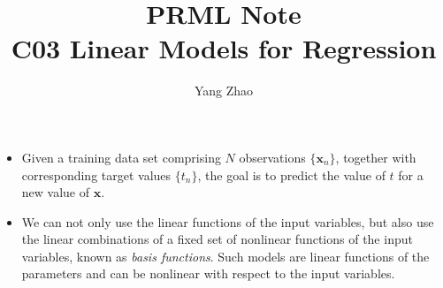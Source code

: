 \documentclass[12pt, a4paper]{article}
\title{PRML Note\\C03 Linear Models for Regression}
\author{Yang Zhao}
\affil{Department of Automation, Tsinghua University}
\date{}
\begin{document}
    \maketitle
    \begin{itemize}
        \item Given a training data set comprising $N$ observations $\{\bm{x}_n\}$, together with 
        corresponding target values $\{t_n\}$, the goal is to predict the value of $t$ for a new 
        value of $\bm{x}$.
        \item We can not only use the linear functions of the input variables, but also use the linear 
        combinations of a fixed set of nonlinear functions of the input variables, known as \textit{basis
         functions}. Such models are linear functions of the parameters and can be nonlinear with 
         respect to the input variables.
    \end{itemize}
\end{document}
